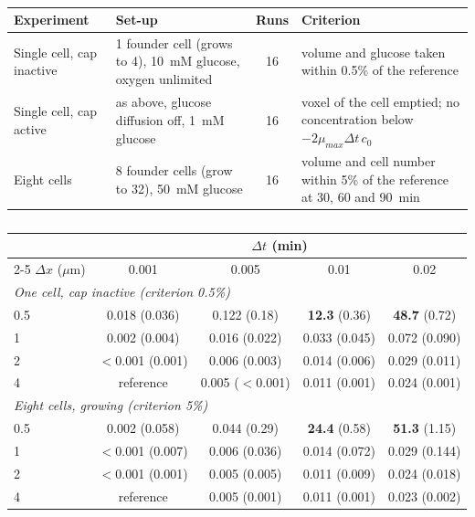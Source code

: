 
\begin{table}[!htbp]
\chcolor
\centering
\caption{}
\label{tab:ut_design}
\small
\begin{tabular}{p{3.0cm}p{5.6cm}cp{4.6cm}}
\toprule
Experiment & Set-up & Runs & Criterion\\
\midrule
Single cell, cap inactive & 1 founder cell (grows to 4), 10~mM glucose, oxygen unlimited & 16 & volume and glucose taken within 0.5\% of the reference\\
Single cell, cap active & as above, glucose diffusion off, 1~mM glucose & 16 & voxel of the cell emptied; no concentration below $-2\mu_{max}\Delta t\,c_0$\\
Eight cells & 8 founder cells (grow to 32), 50~mM glucose & 16 & volume and cell number within 5\% of the reference at 30, 60 and 90~min\\
\bottomrule
\end{tabular}
\end{table}

\begin{table}[!htbp]
\chcolor
\centering
\caption{}
\label{tab:ut_dxdt}
\small
\begin{tabular}{lcccc}
\toprule
 & \multicolumn{4}{c}{$\Delta t$ (min)}\\
\cmidrule(lr){2-5}
$\Delta x$ ($\mu$m) & 0.001 & 0.005 & 0.01 & 0.02\\
\midrule
\multicolumn{5}{l}{\textit{One cell, cap inactive (criterion 0.5\%)}}\\
0.5 & 0.018 (0.036) & 0.122 (0.18) & \textbf{12.3} (0.36) & \textbf{48.7} (0.72)\\
1   & 0.002 (0.004) & 0.016 (0.022) & 0.033 (0.045) & 0.072 (0.090)\\
2   & $<$0.001 (0.001) & 0.006 (0.003) & 0.014 (0.006) & 0.029 (0.011)\\
4   & reference & 0.005 ($<$0.001) & 0.011 (0.001) & 0.024 (0.001)\\
\midrule
\multicolumn{5}{l}{\textit{Eight cells, growing (criterion 5\%)}}\\
0.5 & 0.002 (0.058) & 0.044 (0.29) & \textbf{24.4} (0.58) & \textbf{51.3} (1.15)\\
1   & $<$0.001 (0.007) & 0.006 (0.036) & 0.014 (0.072) & 0.029 (0.144)\\
2   & $<$0.001 (0.001) & 0.005 (0.005) & 0.011 (0.009) & 0.024 (0.018)\\
4   & reference & 0.005 (0.001) & 0.011 (0.001) & 0.023 (0.002)\\
\bottomrule
\end{tabular}
\end{table}

